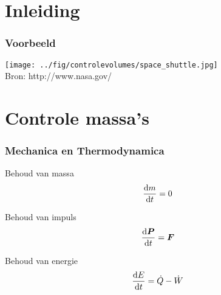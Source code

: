 \documentclass[t]{beamer}
\subtitle{Controle volumes}
\begin{document}
	\frame{\titlepage}
	\section{Inleiding}
		\begin{frame}
			\frametitle{Voorbeeld}
			\center
    		\texttt{[image: ../fig/controlevolumes/space\_shuttle.jpg]}\\
			\footnotesize{Bron: http://www.nasa.gov/}
  		\end{frame}
  	\section{Controle massa's}	
  		\begin{frame}
			\frametitle{Mechanica en Thermodynamica}
			\vspace{1cm}
			\pause 
			Behoud van massa
			\begin{equation}
				\frac{\mathrm{d} m}{\mathrm{d} t} = 0
			\end{equation}
			
			\pause 			
			Behoud van impuls
			\begin{equation}
				\frac{\mathrm{d} \boldsymbol{P}}{\mathrm{d} t} = \boldsymbol{F}
			\end{equation}
			
			\pause 
			Behoud van energie
			\begin{equation}
				\frac{\mathrm{d} E}{\mathrm{d} t} = \dot{Q}-\dot{W}
			\end{equation}
  		\end{frame}
\end{document}

